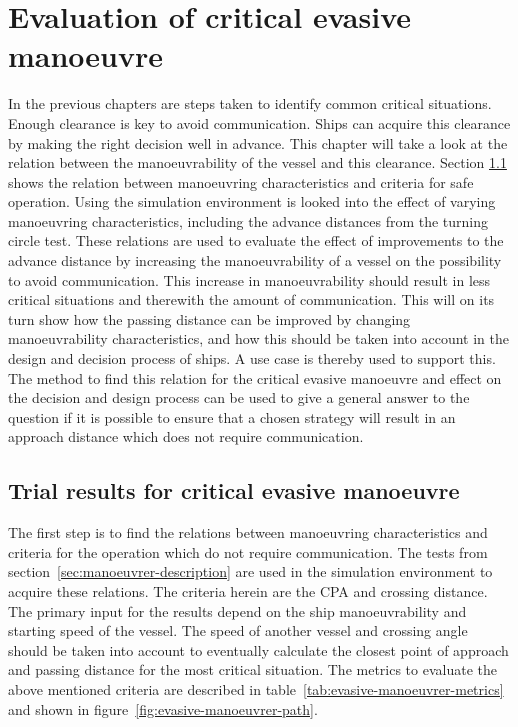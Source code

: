 \chapter{Evaluation of critical evasive manoeuvre}
In the previous chapters are steps taken to identify common critical situations. Enough clearance is key to avoid communication. Ships can acquire this clearance by making the right decision well in advance. This chapter will take a look at the relation between the manoeuvrability of the vessel and this clearance. Section \ref{sec:trial-result} shows the relation between manoeuvring characteristics and criteria for safe operation. Using the simulation environment is looked into the effect of varying manoeuvring characteristics, including the advance distances from the turning circle test.
These relations are used to evaluate the effect of improvements to the advance distance by increasing the manoeuvrability of a vessel on the possibility to avoid communication. This increase in manoeuvrability should result in less critical situations and therewith the amount of communication. This will on its turn show how the passing distance can be improved by changing manoeuvrability characteristics, and how this should be taken into account in the design and decision process of ships. A use case is thereby used to support this.
The method to find this relation for the critical evasive manoeuvre and effect on the decision and design process can be used to give a general answer to the question if it is possible to ensure that a chosen strategy will result in an approach distance which does not require communication.

\section{Trial results for critical evasive manoeuvre}
\label{sec:trial-result}
The first step is to find the relations between manoeuvring characteristics and criteria for the operation which do not require communication. The tests from section~\ref{sec:manoeuvrer-description} are used in the simulation environment to acquire these relations. The criteria herein are the \ac{CPA} and crossing distance. The primary input for the results depend on the ship manoeuvrability and starting speed of the vessel. The speed of another vessel and crossing angle should be taken into account to eventually calculate the closest point of approach and passing distance for the most critical situation. The metrics to evaluate the above mentioned criteria are described in table~\ref{tab:evasive-manoeuvrer-metrics} and shown in figure~\ref{fig:evasive-manoeuvrer-path}.

